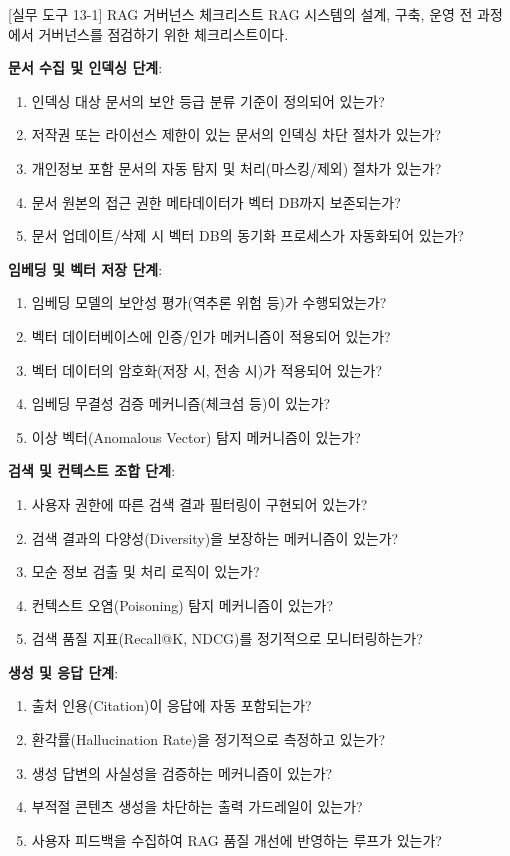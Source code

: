 \begin{practicaltool}{[실무 도구 13-1] RAG 거버넌스 체크리스트}
RAG 시스템의 설계, 구축, 운영 전 과정에서 거버넌스를 점검하기 위한 체크리스트이다.

\textbf{문서 수집 및 인덱싱 단계}:
\begin{enumerate}
 \item 인덱싱 대상 문서의 보안 등급 분류 기준이 정의되어 있는가?
 \item 저작권 또는 라이선스 제한이 있는 문서의 인덱싱 차단 절차가 있는가?
 \item 개인정보 포함 문서의 자동 탐지 및 처리(마스킹/제외) 절차가 있는가?
 \item 문서 원본의 접근 권한 메타데이터가 벡터 DB까지 보존되는가?
 \item 문서 업데이트/삭제 시 벡터 DB의 동기화 프로세스가 자동화되어 있는가?
\end{enumerate}

\textbf{임베딩 및 벡터 저장 단계}:
\begin{enumerate}
 \item 임베딩 모델의 보안성 평가(역추론 위험 등)가 수행되었는가?
 \item 벡터 데이터베이스에 인증/인가 메커니즘이 적용되어 있는가?
 \item 벡터 데이터의 암호화(저장 시, 전송 시)가 적용되어 있는가?
 \item 임베딩 무결성 검증 메커니즘(체크섬 등)이 있는가?
 \item 이상 벡터(Anomalous Vector) 탐지 메커니즘이 있는가?
\end{enumerate}

\textbf{검색 및 컨텍스트 조합 단계}:
\begin{enumerate}
 \item 사용자 권한에 따른 검색 결과 필터링이 구현되어 있는가?
 \item 검색 결과의 다양성(Diversity)을 보장하는 메커니즘이 있는가?
 \item 모순 정보 검출 및 처리 로직이 있는가?
 \item 컨텍스트 오염(Poisoning) 탐지 메커니즘이 있는가?
 \item 검색 품질 지표(Recall@K, NDCG)를 정기적으로 모니터링하는가?
\end{enumerate}

\textbf{생성 및 응답 단계}:
\begin{enumerate}
 \item 출처 인용(Citation)이 응답에 자동 포함되는가?
 \item 환각률(Hallucination Rate)을 정기적으로 측정하고 있는가?
 \item 생성 답변의 사실성을 검증하는 메커니즘이 있는가?
 \item 부적절 콘텐츠 생성을 차단하는 출력 가드레일이 있는가?
 \item 사용자 피드백을 수집하여 RAG 품질 개선에 반영하는 루프가 있는가?
\end{enumerate}


\end{practicaltool}

